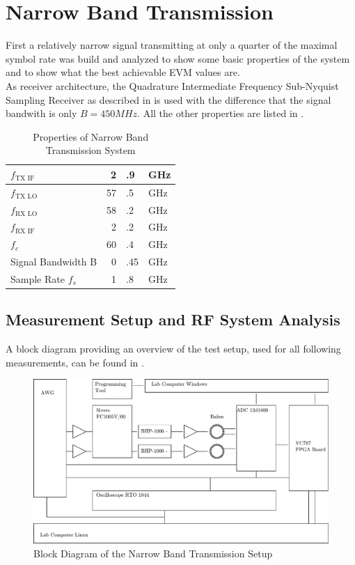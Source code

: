 \chapter{Narrow Band Transmission}
\label{chap:res_450}
First a relatively narrow signal transmitting at only a quarter
of the maximal symbol rate was build and analyzed to show some basic
properties of the system and to show what the best achievable
\gls{EVM} values are. \\

As receiver architecture, the Quadrature Intermediate Frequency Sub-Nyquist
Sampling Receiver as described in  is used with the difference
that the signal bandwith is only $B = 450 MHz$. All the other properties are listed
in . \\

\begin{table}[h]
  \centering
  \begin{tabular}{|l|r@{}l@{~}l|}
    \hline
    $f_{\text{TX IF}}$ & 2&.9&GHz \\ \hline
    $f_{\text{TX LO}}$ & 57&.5&GHz \\ \hline
    $f_{\text{RX LO}}$ & 58&.2&GHz \\ \hline
    $f_{\text{RX IF}}$ & 2&.2&GHz \\ \hline
    $f_c$            & 60&.4&GHz \\ \hline
    Signal Bandwidth B & 0&.45&GHz \\ \hline
    Sample Rate $f_s$ & 1&.8&GHz \\ \hline
  \end{tabular}
  \caption{Properties of Narrow Band Transmission System}
  \label{tab:res_450}
\end{table}

\section{Measurement Setup and RF System Analysis}
A block diagram providing an overview of the test setup,
used for all following measurements, can be found in . \\

\begin{figure}[p]
  \centering
  \includegraphics[width=\textwidth]{figures/res_450_setup}
  \caption{Block Diagram of the Narrow Band Transmission Setup}
  \label{fig:res_450_bd}
\end{figure}

